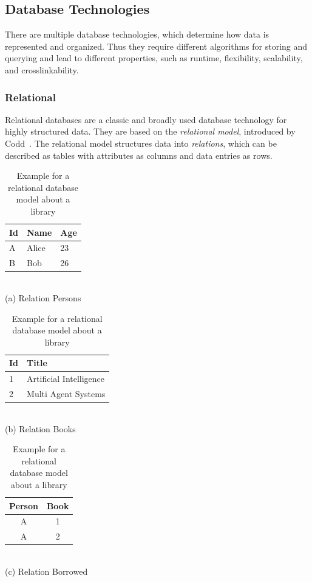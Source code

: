 \subsection{Database Technologies}
\label{sec:db-designs}
There are multiple database technologies, which determine how data is
represented and organized. Thus they require different algorithms for
storing and querying and lead to different properties, such as
runtime, flexibility, scalability, and crosslinkability.

\subsubsection{Relational}
\label{sec:relational}
Relational databases are a classic and broadly used database
technology for highly structured data. They are based on the
\emph{relational model}, introduced by
Codd~\cite{database-designs,relational}. The relational model
structures data into \emph{relations}, which can be described as
tables with attributes as columns and data entries as rows.
\begin{table}[ht]
  \begin{minipage}[b]{0.3\linewidth}\centering
  \begin{tabular}{ l|l|l }
    Id & Name & Age\\
    \hline
    A & Alice & 23\\
    B & Bob & 26\\
  \end{tabular}
  \\\vspace{0.2cm}
  (a) Relation Persons
\end{minipage}
\hspace{0.5cm}
\begin{minipage}[b]{0.3\linewidth}
\centering
  \begin{tabular}{ l|l }
    Id & Title\\
    \hline
    1 & Artificial Intelligence\\
    2 & Multi Agent Systems \\
  \end{tabular}
  \\\vspace{0.2cm}
  (b) Relation Books
\end{minipage}
\hspace{0.5cm}
\begin{minipage}[b]{0.3\linewidth}
\centering
  \begin{tabular}{ c|c }
    Person & Book\\
    \hline
    A & 1\\
    A & 2\\
  \end{tabular}
  \\\vspace{0.2cm}
  (c) Relation Borrowed
\end{minipage}
  \caption{Example for a relational database model about a
    library}
  \label{tab:relational-example}
\end{table}

